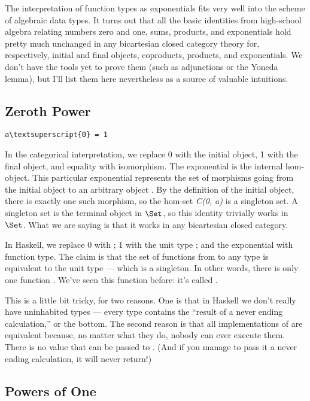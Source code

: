 The interpretation of function types as exponentials fits very well into
the scheme of algebraic data types. It turns out that all the basic
identities from high-school algebra relating numbers zero and one, sums,
products, and exponentials hold pretty much unchanged in any bicartesian
closed category theory for, respectively, initial and final objects,
coproducts, products, and exponentials. We don't have the tools yet to
prove them (such as adjunctions or the Yoneda lemma), but I'll list them
here nevertheless as a source of valuable intuitions.

\subsection{Zeroth Power}\label{zeroth-power}

\begin{Verbatim}[commandchars=\\\{\}]
a\textsuperscript{0} = 1
\end{Verbatim}
In the categorical interpretation, we replace 0 with the initial object,
1 with the final object, and equality with isomorphism. The exponential
is the internal hom-object. This particular exponential represents the
set of morphisms going from the initial object to an arbitrary object
. By the definition of the initial object, there is exactly
one such morphism, so the hom-set \emph{C(0, a)} is a singleton set. A
singleton set is the terminal object in $\Set$, so this identity
trivially works in $\Set$. What we are saying is that it works in
any bicartesian closed category.

In Haskell, we replace 0 with ; 1 with the unit type
\code{()}; and the exponential with function type. The claim is that
the set of functions from  to any type  is
equivalent to the unit type --- which is a singleton. In other words,
there is only one function . We've seen
this function before: it's called .

This is a little bit tricky, for two reasons. One is that in Haskell we
don't really have uninhabited types --- every type contains the ``result
of a never ending calculation,'' or the bottom. The second reason is
that all implementations of  are equivalent because, no
matter what they do, nobody can ever execute them. There is no value
that can be passed to . (And if you manage to pass it a
never ending calculation, it will never return!)

\subsection{Powers of One}\label{powers-of-one}

